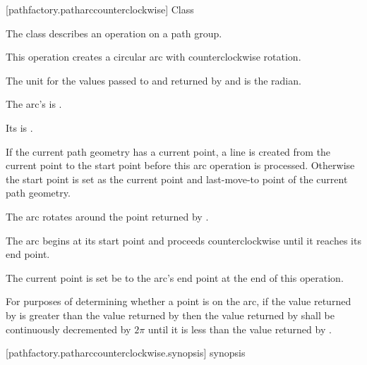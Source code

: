  [pathfactory.patharccounterclockwise] {Class }

\pnum
{}
The class  describes an operation on a path group.

\pnum
This operation creates a circular arc with counterclockwise rotation.

\pnum
The unit for the values passed to and returned by  and  is the radian.

\pnum
The arc's  is .

\pnum
Its  is .

\pnum
If the current path geometry has a current point, a line is created from the current point to the start point before this arc operation is processed. Otherwise the start point is set as the current point and last-move-to point of the current path geometry.

\pnum
The arc rotates around the point returned by .

\pnum
The arc begins at its start point and proceeds counterclockwise until it reaches its end point.

\pnum
The current point is set be to the arc's end point at the end of this operation.

\pnum
For purposes of determining whether a point is on the arc, if the value returned by  is greater than the value returned by  then the value returned by  shall be continuously decremented by $2\pi$ until it is less than the value returned by .

 [pathfactory.patharccounterclockwise.synopsis] { synopsis}

